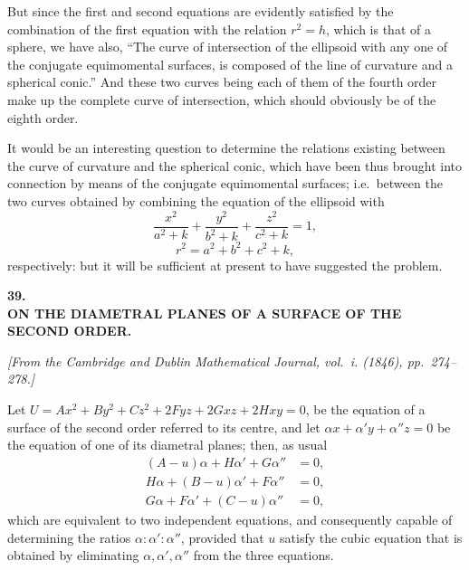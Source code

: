 \documentclass[11pt]{article}
\begin{document}
But since the first and second equations are evidently satisfied by the combination of the first equation with the relation $r^2 = h$, which is that of a sphere, we have also, ``The curve of intersection of the ellipsoid with any one of the conjugate equimomental surfaces, is composed of the line of curvature and a spherical conic.'' And these two curves being each of them of the fourth order make up the complete curve of intersection, which should obviously be of the eighth order.

It would be an interesting question to determine the relations existing between the curve of curvature and the spherical conic, which have been thus brought into connection by means of the conjugate equimomental surfaces; i.e.\ between the two curves obtained by combining the equation of the ellipsoid with
\[
\frac{x^2}{a^2+k} + \frac{y^2}{b^2+k} + \frac{z^2}{c^2+k} = 1,
\]
\[
r^2 = a^2 + b^2 + c^2 + k,
\]
respectively: but it will be sufficient at present to have suggested the problem.

\newpage
\setcounter{page}{255}

\begin{center}
{\Large\bfseries 39.}\\[1em]
{\Large\bfseries ON THE DIAMETRAL PLANES OF A SURFACE OF THE\\ SECOND ORDER.}
\end{center}

\medskip

\textit{[From the Cambridge and Dublin Mathematical Journal, vol.~i. (1846), pp.~274--278.]}

\bigskip

Let $U = Ax^2 + By^2 + Cz^2 + 2Fyz + 2Gxz + 2Hxy = 0$, be the equation of a surface of the second order referred to its centre, and let $\alpha x + \alpha' y + \alpha'' z = 0$ be the equation of one of its diametral planes; then, as usual
\begin{align*}
(A-u)\alpha + H\alpha' + G\alpha'' &= 0,\\
H\alpha + (B-u)\alpha' + F\alpha'' &= 0,\\
G\alpha + F\alpha' + (C-u)\alpha'' &= 0,
\end{align*}
which are equivalent to two independent equations, and consequently capable of determining the ratios $\alpha : \alpha' : \alpha''$, provided that $u$ satisfy the cubic equation that is obtained by eliminating $\alpha, \alpha', \alpha''$ from the three equations.
\end{document}
